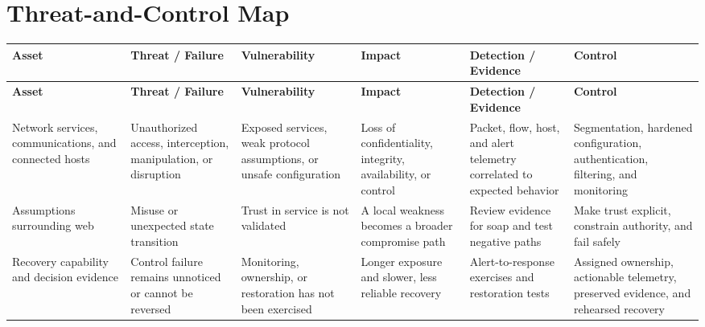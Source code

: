 \documentclass[11pt,letterpaper]{article}
\begin{document}
\section*{Threat-and-Control Map}
\begingroup\scriptsize\setlength{\tabcolsep}{2pt}
\begin{longtable}{>{\raggedright\arraybackslash}p{}>{\raggedright\arraybackslash}p{}>{\raggedright\arraybackslash}p{}>{\raggedright\arraybackslash}p{}>{\raggedright\arraybackslash}p{}>{\raggedright\arraybackslash}p{}}
\toprule\rowcolor{Navy}\color{white}\textbf{Asset} & \color{white}\textbf{Threat / Failure} & \color{white}\textbf{Vulnerability} & \color{white}\textbf{Impact} & \color{white}\textbf{Detection / Evidence} & \color{white}\textbf{Control}\\\midrule
\endfirsthead
\toprule\rowcolor{Navy}\color{white}\textbf{Asset} & \color{white}\textbf{Threat / Failure} & \color{white}\textbf{Vulnerability} & \color{white}\textbf{Impact} & \color{white}\textbf{Detection / Evidence} & \color{white}\textbf{Control}\\\midrule
\endhead
Network services, communications, and connected hosts & Unauthorized access, interception, manipulation, or disruption & Exposed services, weak protocol assumptions, or unsafe configuration & Loss of confidentiality, integrity, availability, or control & Packet, flow, host, and alert telemetry correlated to expected behavior & Segmentation, hardened configuration, authentication, filtering, and monitoring\\\midrule
Assumptions surrounding web & Misuse or unexpected state transition & Trust in service is not validated & A local weakness becomes a broader compromise path & Review evidence for soap and test negative paths & Make trust explicit, constrain authority, and fail safely\\\midrule
Recovery capability and decision evidence & Control failure remains unnoticed or cannot be reversed & Monitoring, ownership, or restoration has not been exercised & Longer exposure and slower, less reliable recovery & Alert-to-response exercises and restoration tests & Assigned ownership, actionable telemetry, preserved evidence, and rehearsed recovery\\\midrule
\bottomrule
\end{longtable}
\endgroup
\end{document}
